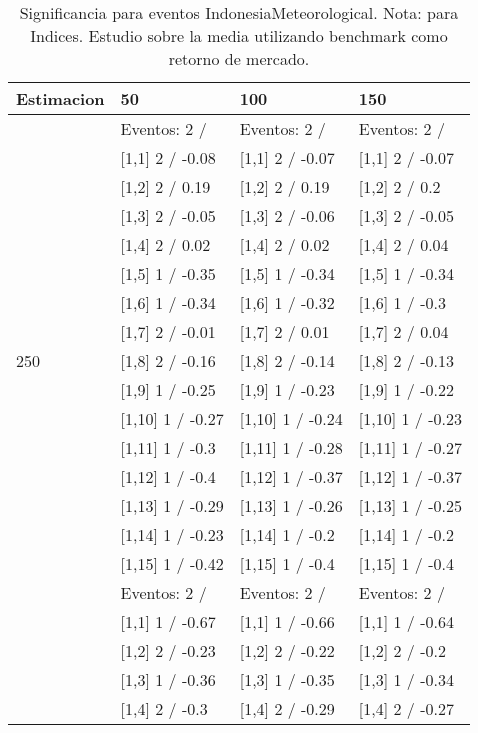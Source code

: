 \begin{table}

\caption{Significancia para eventos IndonesiaMeteorological. Nota: para Indices. Estudio sobre la media utilizando benchmark como retorno de mercado.}
\centering
\begin{tabular}[t]{llll}
\toprule
Estimacion & 50 & 100 & 150\\
\midrule
 & Eventos:  2 / & Eventos:  2 / & Eventos:  2 /\\
 & {}[1,1] 2  / -0.08 & {}[1,1] 2  / -0.07 & {}[1,1] 2  / -0.07\\
 & {}[1,2] 2  / 0.19 & {}[1,2] 2  / 0.19 & {}[1,2] 2  / 0.2\\
 & {}[1,3] 2  / -0.05 & {}[1,3] 2  / -0.06 & {}[1,3] 2  / -0.05\\
 & {}[1,4] 2  / 0.02 & {}[1,4] 2  / 0.02 & {}[1,4] 2  / 0.04\\
\addlinespace
 & {}[1,5] 1  / -0.35 & {}[1,5] 1  / -0.34 & {}[1,5] 1  / -0.34\\
 & {}[1,6] 1  / -0.34 & {}[1,6] 1  / -0.32 & {}[1,6] 1  / -0.3\\
 & {}[1,7] 2  / -0.01 & {}[1,7] 2  / 0.01 & {}[1,7] 2  / 0.04\\
250 & {}[1,8] 2  / -0.16 & {}[1,8] 2  / -0.14 & {}[1,8] 2  / -0.13\\
 & {}[1,9] 1  / -0.25 & {}[1,9] 1  / -0.23 & {}[1,9] 1  / -0.22\\
\addlinespace
 & {}[1,10] 1  / -0.27 & {}[1,10] 1  / -0.24 & {}[1,10] 1  / -0.23\\
 & {}[1,11] 1  / -0.3 & {}[1,11] 1  / -0.28 & {}[1,11] 1  / -0.27\\
 & {}[1,12] 1  / -0.4 & {}[1,12] 1  / -0.37 & {}[1,12] 1  / -0.37\\
 & {}[1,13] 1  / -0.29 & {}[1,13] 1  / -0.26 & {}[1,13] 1  / -0.25\\
 & {}[1,14] 1  / -0.23 & {}[1,14] 1  / -0.2 & {}[1,14] 1  / -0.2\\
\addlinespace
 & {}[1,15] 1  / -0.42 & {}[1,15] 1  / -0.4 & {}[1,15] 1  / -0.4\\
 & Eventos:  2 / & Eventos:  2 / & Eventos:  2 /\\
 & {}[1,1] 1  / -0.67 & {}[1,1] 1  / -0.66 & {}[1,1] 1  / -0.64\\
 & {}[1,2] 2  / -0.23 & {}[1,2] 2  / -0.22 & {}[1,2] 2  / -0.2\\
 & {}[1,3] 1  / -0.36 & {}[1,3] 1  / -0.35 & {}[1,3] 1  / -0.34\\
\addlinespace
 & {}[1,4] 2  / -0.3 & {}[1,4] 2  / -0.29 & {}[1,4] 2  / -0.27\\

\end{tabular}
\end{table}
